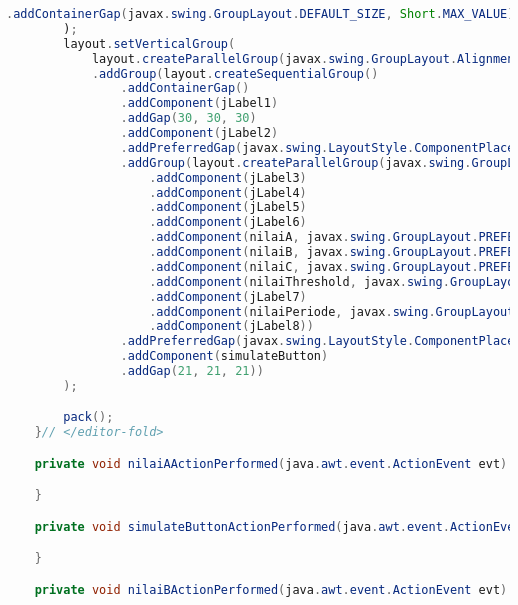\begin{lstlisting}[language=Java, caption=Entrepreneurs.java]
                .addContainerGap(javax.swing.GroupLayout.DEFAULT_SIZE, Short.MAX_VALUE))
        );
        layout.setVerticalGroup(
            layout.createParallelGroup(javax.swing.GroupLayout.Alignment.LEADING)
            .addGroup(layout.createSequentialGroup()
                .addContainerGap()
                .addComponent(jLabel1)
                .addGap(30, 30, 30)
                .addComponent(jLabel2)
                .addPreferredGap(javax.swing.LayoutStyle.ComponentPlacement.UNRELATED)
                .addGroup(layout.createParallelGroup(javax.swing.GroupLayout.Alignment.BASELINE)
                    .addComponent(jLabel3)
                    .addComponent(jLabel4)
                    .addComponent(jLabel5)
                    .addComponent(jLabel6)
                    .addComponent(nilaiA, javax.swing.GroupLayout.PREFERRED_SIZE, javax.swing.GroupLayout.DEFAULT_SIZE, javax.swing.GroupLayout.PREFERRED_SIZE)
                    .addComponent(nilaiB, javax.swing.GroupLayout.PREFERRED_SIZE, javax.swing.GroupLayout.DEFAULT_SIZE, javax.swing.GroupLayout.PREFERRED_SIZE)
                    .addComponent(nilaiC, javax.swing.GroupLayout.PREFERRED_SIZE, javax.swing.GroupLayout.DEFAULT_SIZE, javax.swing.GroupLayout.PREFERRED_SIZE)
                    .addComponent(nilaiThreshold, javax.swing.GroupLayout.PREFERRED_SIZE, javax.swing.GroupLayout.DEFAULT_SIZE, javax.swing.GroupLayout.PREFERRED_SIZE)
                    .addComponent(jLabel7)
                    .addComponent(nilaiPeriode, javax.swing.GroupLayout.PREFERRED_SIZE, javax.swing.GroupLayout.DEFAULT_SIZE, javax.swing.GroupLayout.PREFERRED_SIZE)
                    .addComponent(jLabel8))
                .addPreferredGap(javax.swing.LayoutStyle.ComponentPlacement.RELATED, 27, Short.MAX_VALUE)
                .addComponent(simulateButton)
                .addGap(21, 21, 21))
        );

        pack();
    }// </editor-fold>                        

    private void nilaiAActionPerformed(java.awt.event.ActionEvent evt) {                                       

    }                                      

    private void simulateButtonActionPerformed(java.awt.event.ActionEvent evt) {                                               

    }                                              

    private void nilaiBActionPerformed(java.awt.event.ActionEvent evt) {                                       


\end{lstlisting}

